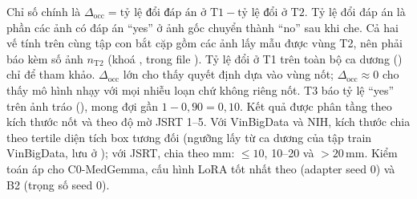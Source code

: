 Chỉ số chính là $\Delta_{\text{occ}} = \text{tỷ lệ đổi đáp án ở T1} - \text{tỷ lệ đổi ở T2}$. Tỷ lệ đổi đáp án là
phần các ảnh có đáp án ``yes'' ở ảnh gốc chuyển thành ``no'' sau khi che. Cả hai vế tính trên cùng tập con bắt cặp
gồm các ảnh lấy mẫu được vùng T2, nên phải báo kèm số ảnh $n_{\text{T2}}$ (khoá ,  trong
file ). Tỷ lệ đổi ở T1 trên toàn bộ ca dương () chỉ để tham khảo.
$\Delta_{\text{occ}}$ lớn cho thấy quyết định dựa vào vùng nốt; $\Delta_{\text{occ}} \approx 0$ cho thấy mô hình
nhạy với mọi nhiễu loạn chứ không riêng nốt. T3 báo tỷ lệ ``yes'' trên ảnh tráo (), mong đợi
gần $1 - 0{,}90 = 0{,}10$. Kết quả được phân tầng theo kích thước nốt và theo độ mờ JSRT 1--5. Với VinBigData và NIH,
kích thước chia theo tertile diện tích box tương đối (ngưỡng lấy từ ca dương của tập train VinBigData, lưu ở
); với JSRT, chia theo mm: $\le 10$, 10--20 và $> 20$\,mm. Kiểm toán áp cho
C0-MedGemma, cấu hình LoRA tốt nhất theo  (adapter seed 0) và B2 (trọng số seed 0).
